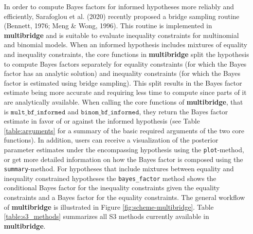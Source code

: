 \documentclass[
  english,
  man,floatsintext]{apa6}
\begin{document}
In order to compute Bayes factors for informed hypotheses more reliably and efficiently, Sarafoglou et al. (2020) recently proposed a bridge sampling routine (Bennett, 1976; Meng \& Wong, 1996). This routine is implemented in \textbf{multibridge} and is suitable to evaluate inequality constraints for multinomial and binomial models. When an informed hypothesis includes mixtures of equality and inequality constraints, the core functions in \textbf{multibridge} split the hypothesis to compute Bayes factors separately for equality constraints (for which the Bayes factor has an analytic solution) and inequality constraints (for which the Bayes factor is estimated using bridge sampling). This split results in the Bayes factor estimate being more accurate and requiring less time to compute since parts of it are analytically available. When calling the core functions of \textbf{multibridge}, that is \(\texttt{mult\_bf\_informed}\) and \(\texttt{binom\_bf\_informed}\), they return the Bayes factor estimate in favor of or against the informed hypothesis (see Table \ref{table:arguments} for a summary of the basic required arguments of the two core functions). In addition, users can receive a visualization of the posterior parameter estimates under the encompassing hypothesis using the \texttt{plot}-method, or get more detailed information on how the Bayes factor is composed using the \texttt{summary}-method. For hypotheses that include mixtures between equality and inequality constrained hypotheses the \texttt{bayes\_factor} method shows the conditional Bayes factor for the inequality constraints given the equality constraints and a Bayes factor for the equality constraints. The general workflow of \textbf{multibridge} is illustrated in Figure \ref{fig:scheme-multibridge}. Table \ref{table:s3_methods} summarizes all S3 methods currently available in \textbf{multibridge}.
\end{document}
